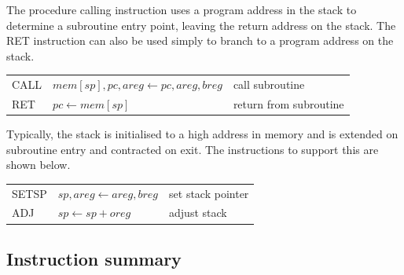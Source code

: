 \documentclass[a4paper, 12pt]{article}
\begin{document}
The procedure calling instruction uses a program address in the stack
to determine a subroutine entry point, leaving the return address on the 
stack. The RET instruction can also be used simply to branch to 
a program address on the stack.

\begin{tabular}{lll}
CALL & $mem[sp], pc, areg \leftarrow pc, areg, breg $ &call subroutine\\
RET   & $pc \leftarrow mem[sp] $ & return from subroutine
\end{tabular}

Typically, the stack is initialised to a high address in memory and is
extended on subroutine entry and contracted on exit. 
The instructions to support this are shown below.

\begin{tabular}{lll}
SETSP & $sp, areg  \leftarrow areg, breg $& set stack pointer \\
ADJ & $sp \leftarrow sp + oreg $& adjust stack
\end{tabular}


\newpage
\subsection*{Instruction summary}
\end{document}
